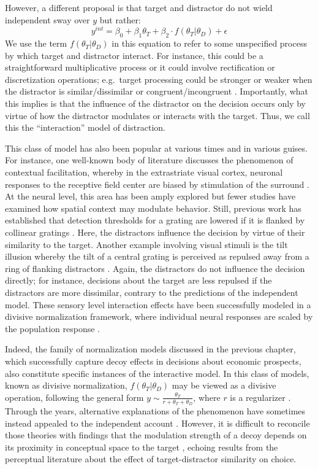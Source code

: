 \documentclass[a4paper, nobind]{templates/ociamthesis}
\begin{document}
However, a different proposal is that target and distractor do not wield independent sway over \(y\) but rather:
\begin{equation}
y^{int} = \beta_0 + \beta_1\theta_T + \beta_2\cdot f(\theta_T|\theta_D) + \epsilon
\end{equation}
We use the term \(f(\theta_T|\theta_D)\) in this equation to refer to some unspecified process by which target and distractor interact. For instance, this could be a straightforward multiplicative process or it could involve rectification or discretization operations; e.g.~target processing could be stronger or weaker when the distractor is similar/dissimilar \autocite{blakemore1970} or congruent/incongruent \autocite{eriksen1974}. Importantly, what this implies is that the influence of the distractor on the decision occurs only by virtue of how the distractor modulates or interacts with the target. Thus, we call this the ``interaction'' model of distraction.

This class of model has also been popular at various times and in various guises. For instance, one well-known body of literature discusses the phenomenon of contextual facilitation, whereby in the extrastriate visual cortex, neuronal responses to the receptive field center are biased by stimulation of the surround \autocite{krause2014}. At the neural level, this area has been amply explored but fewer studies have examined how spatial context may modulate behavior. Still, previous work has established that detection thresholds for a grating are lowered if it is flanked by collinear gratings \autocite{polat1994,kapadia1995,ito1999,gilbert2013}. Here, the distractors influence the decision by virtue of their similarity to the target. Another example involving visual stimuli is the tilt illusion whereby the tilt of a central grating is perceived as repulsed away from a ring of flanking distractors \autocite{blakemore1970}. Again, the distractors do not influence the decision directly; for instance, decisions about the target are less repulsed if the distractors are more dissimilar, contrary to the predictions of the independent model. These sensory level interaction effects have been successfully modeled in a divisive normalization framework, where individual neural responses are scaled by the population response \autocite{carandini2012}.

Indeed, the family of normalization models discussed in the previous chapter, which successfully capture decoy effects in decisions about economic prospects, also constitute specific instances of the interactive model. In this class of models, known as divisive normalization, \(f(\theta_T|\theta_D)\) may be viewed as a divisive operation, following the general form \(y \sim \frac{\theta_T}{r+\theta_T+\theta_D}\), where \(r\) is a regularizer \autocite{louie2013,landry2021}. Through the years, alternative explanations of the phenomenon have sometimes instead appealed to the independent account \autocite{busemeyer1993}. However, it is difficult to reconcile those theories with findings that the modulation strength of a decoy depends on its proximity in conceptual space to the target \autocite{soltani2012,landry2021}, echoing results from the perceptual literature about the effect of target-distractor similarity on choice.
\end{document}
